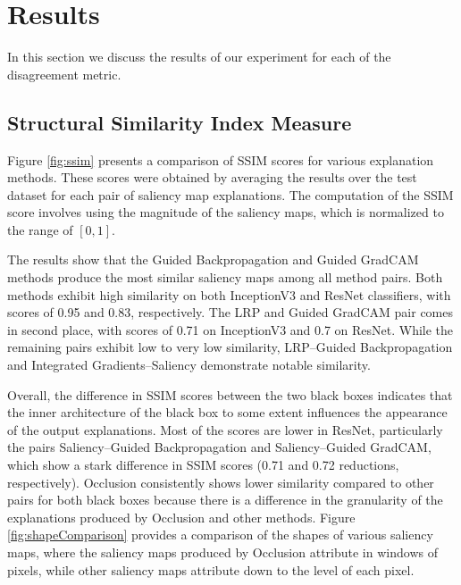 \section{Results}
\label{sec:result}

In this section we discuss the results of our experiment for each of the disagreement metric.

\subsection{Structural Similarity Index Measure}
\label{subsec:ssim}
Figure \ref{fig:ssim} presents a comparison of SSIM scores for various explanation methods. These scores were obtained by averaging the results over the test dataset for each pair of saliency map explanations. The computation of the SSIM score involves using the magnitude of the saliency maps, which is normalized to the range of $[0, 1]$.

The results show that the Guided Backpropagation and Guided GradCAM methods produce the most similar saliency maps among all method pairs. Both methods exhibit high similarity on both InceptionV3 and ResNet classifiers, with scores of 0.95 and 0.83, respectively. The LRP and Guided GradCAM pair comes in second place, with scores of 0.71 on InceptionV3 and 0.7 on ResNet. While the remaining pairs exhibit low to very low similarity, LRP--Guided Backpropagation and Integrated Gradients--Saliency demonstrate notable similarity.

Overall, the difference in SSIM scores between the two black boxes indicates that the inner architecture of the black box to some extent influences the appearance of the output explanations. Most of the scores are lower in ResNet, particularly the pairs Saliency--Guided Backpropagation and Saliency--Guided GradCAM, which show a stark difference in SSIM scores (0.71 and 0.72 reductions, respectively). Occlusion consistently shows lower similarity compared to other pairs for both black boxes because there is a difference in the granularity of the explanations produced by Occlusion and other methods. Figure \ref{fig:shapeComparison} provides a comparison of the shapes of various saliency maps, where the saliency maps produced by Occlusion attribute in windows of pixels, while other saliency maps attribute down to the level of each pixel.

